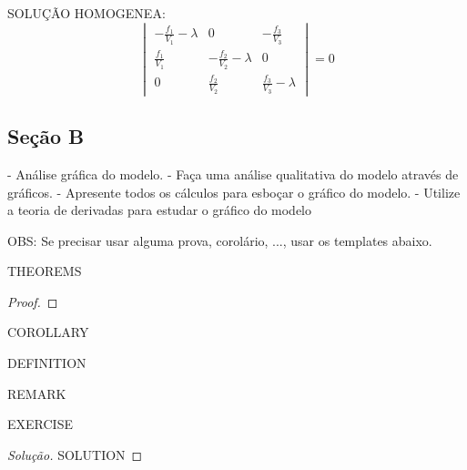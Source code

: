 SOLUÇÃO HOMOGENEA:
\begin{equation}
\renewcommand{\arraystretch}{1.8}
    \begin{vmatrix}
        -\frac{f_1}{V_1}-\lambda & 0 & -\frac{f_3}{V_3}\\
        \frac{f_1}{V_1} & -\frac{f_2}{V_2}-\lambda & 0\\
        0 & \frac{f_2}{V_2} & \frac{f_3}{V_3}-\lambda
    \end{vmatrix}
    =0
\end{equation}



\subsection{Seção B}

- Análise gráfica do modelo.
- Faça uma análise qualitativa do modelo através de gráficos. 
- Apresente todos os cálculos para esboçar o gráfico do modelo. 
- Utilize a teoria de derivadas para estudar o gráfico do modelo


OBS: Se precisar usar alguma prova, corolário, ..., usar os templates abaixo.

\begin{theorem}
THEOREMS
\end{theorem}
\begin{proof}
\end{proof}
\begin{corollary}
COROLLARY
\end{corollary}
\begin{definition}
DEFINITION
\end{definition}
\begin{remark}
REMARK
\end{remark}
\begin{exercise}
EXERCISE
\end{exercise}
\begin{proof}[Solução]
SOLUTION
\end{proof}
\clearpage